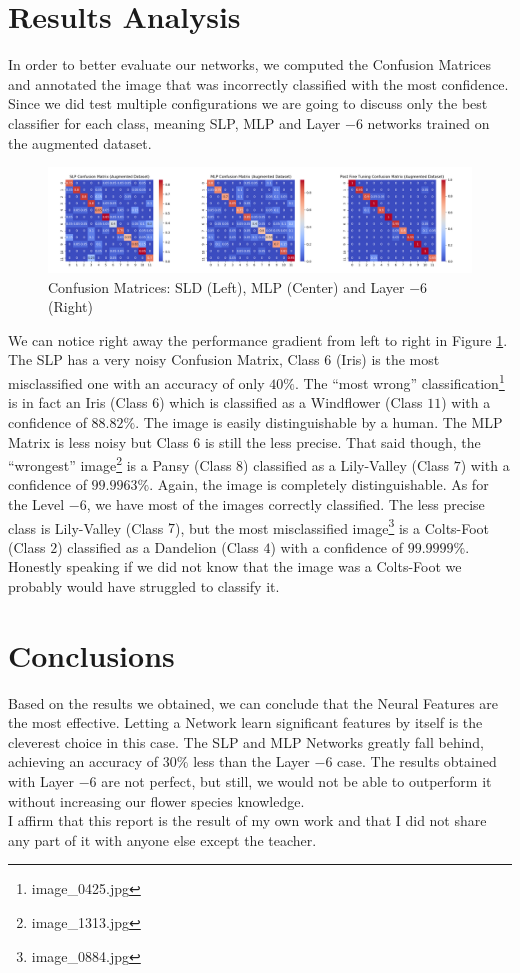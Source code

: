 \documentclass[10pt,a4paper]{report}
\begin{document}
\section{Results Analysis}
In order to better evaluate our networks, we computed the Confusion Matrices and annotated the image that was incorrectly classified with the most confidence. Since we did test multiple configurations we are going to discuss only the best classifier for each class, meaning SLP, MLP and Layer $-6$ networks trained on the augmented dataset. 
\begin{figure}[!ht]
\centering
\includegraphics[width=\linewidth]{conf_mat.png}
\caption{Confusion Matrices: SLD (Left), MLP (Center) and Layer $-6$ (Right)}
\label{fig:confmat}
\end{figure} 
We can notice right away the performance gradient from left to right in Figure \ref{fig:confmat}. The SLP has a very noisy Confusion Matrix, Class $6$ (Iris) is the most misclassified one with an accuracy of only $40 \%$. The \enquote{most wrong} classification\footnote{image\_0425.jpg} is in fact an Iris (Class $6$) which is classified as a Windflower (Class $11$) with a confidence of $88.82 \%$. The image is easily distinguishable by a human. The MLP Matrix is less noisy but Class $6$ is still the less precise. That said though, the \enquote{wrongest} image\footnote{image\_1313.jpg} is a Pansy (Class $8$) classified as a Lily-Valley (Class $7$) with a confidence of $99.9963 \%$. Again, the image is completely distinguishable. As for the Level $-6$, we have most of the images correctly classified. The less precise class is Lily-Valley (Class $7$), but the most misclassified image\footnote{image\_0884.jpg} is a Colts-Foot (Class $2$) classified as a Dandelion (Class $4$) with a confidence of $99.9999 \%$. Honestly speaking if we did not know that the image was a Colts-Foot we probably would have struggled to classify it. 
\section{Conclusions}
Based on the results we obtained, we can conclude that the Neural Features are the most effective. Letting a Network learn significant features by itself is the cleverest choice in this case. The SLP and MLP Networks greatly fall behind, achieving an accuracy of $30 \%$ less than the Layer $-6$ case. The results obtained with Layer $-6$ are not perfect, but still, we would not be able to outperform it without increasing our flower species knowledge. 
\vspace*{\fill}
\\
I affirm that this report is the result of my own work and that I did not share any part of it with anyone else except the teacher.
\\
\end{document}
